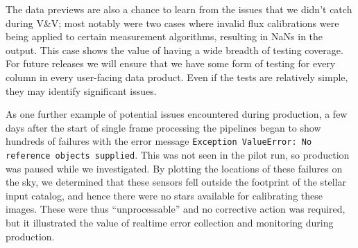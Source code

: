 
The data previews are also a chance to learn from the issues that we didn’t catch during V\&V; most
notably were two cases where invalid flux calibrations were being applied to certain measurement
algorithms, resulting in NaNs in the output. This case shows the value of having a wide breadth of
testing coverage. For future releases we will ensure that we have some form of testing for every
column in every user-facing data product. Even if the tests are relatively simple, they may identify
significant issues.

As one further example of potential issues encountered during production, a few days after the start
of single frame processing the pipelines began to show hundreds of failures with the error message
\texttt{Exception ValueError: No reference objects supplied}. This was not seen in the pilot run, so
production was paused while we investigated. By plotting the locations of these failures on the sky,
we determined that these sensors fell outside the footprint of the stellar input catalog, and hence
there were no stars available for calibrating these images. These were thus “unprocessable” and no
corrective action was required, but it illustrated the value of realtime error collection and
monitoring during production.


